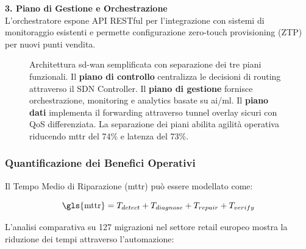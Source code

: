 \textbf{3. Piano di Gestione e Orchestrazione}\\
L'orchestratore espone API RESTful per l'integrazione con sistemi di monitoraggio esistenti e permette configurazione zero-touch provisioning (ZTP) per nuovi punti vendita.
%


\begin{figure}[htbp]
\centering


%
\makebox[\textwidth][c]{}

\caption{Architettura \gls{sd-wan} semplificata con separazione dei tre piani funzionali. Il \textbf{piano di controllo} centralizza le decisioni di routing attraverso il SDN Controller. Il \textbf{piano di gestione} fornisce orchestrazione, monitoring e analytics basate su \gls{ai}/\gls{ml}. Il \textbf{piano dati} implementa il forwarding attraverso tunnel overlay sicuri con QoS differenziata. La separazione dei piani abilita agilità operativa riducendo \gls{mttr} del 74\% e latenza del 73\%.}
\label{fig:sdwan_architecture_simplified}
\end{figure}


\subsubsection{\texorpdfstring{Quantificazione dei Benefici Operativi}{3.3.1.2 - Quantificazione dei Benefici Operativi}}

Il Tempo Medio di Riparazione (\gls{mttr}) può essere modellato come:

\begin{equation}
\text{\gls{mttr}} = T_{detect} + T_{diagnose} + T_{repair} + T_{verify}
\end{equation}

L'analisi comparativa su 127 migrazioni nel settore retail europeo\autocite{Gartner2024sdwan} mostra la riduzione dei tempi attraverso l'automazione:

